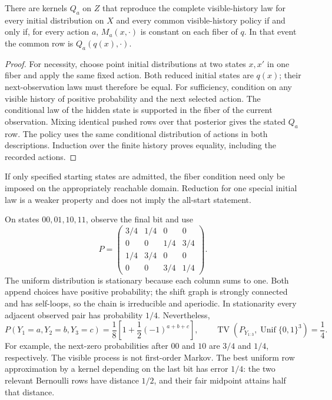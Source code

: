 \begin{theorem}\label{op:lumpability}
There are kernels \(Q_a\) on \(Z\) that reproduce the complete visible-history
law for every initial distribution on \(X\) and every common visible-history
policy if and only if, for every action \(a\), \(M_a(x,\cdot)\) is constant
on each fiber of \(q\).  In that event the common row is
\(Q_a(q(x),\cdot)\).
\end{theorem}
\begin{proof}
For necessity, choose point initial distributions at two states \(x,x'\) in
one fiber and apply the same fixed action.  Both reduced initial states are
\(q(x)\); their next-observation laws must therefore be equal.
For sufficiency, condition on any visible history of positive probability
and the next selected action.  The conditional law of the hidden state is
supported in the fiber of the current observation.  Mixing identical pushed
rows over that posterior gives the stated \(Q_a\) row.  The policy uses the
same conditional distribution of actions in both descriptions.  Induction
over the finite history proves equality, including the recorded actions.
\end{proof}

If only specified starting states are admitted, the fiber condition need
only be imposed on the appropriately reachable domain.  Reduction for one
special initial law is a weaker property and does not imply the all-start
statement.

\begin{example}\label{op:four-state}
On states \(00,01,10,11\), observe the final bit and use
\[
 P=\begin{pmatrix}
 3/4&1/4&0&0\\
 0&0&1/4&3/4\\
 1/4&3/4&0&0\\
 0&0&3/4&1/4
 \end{pmatrix}.
\]
The uniform distribution is stationary because each column sums to one.
Both append choices have positive probability; the shift graph is strongly
connected and has self-loops, so the chain is irreducible and aperiodic.
In stationarity every adjacent observed pair has probability \(1/4\).
Nevertheless,
\[
 P(Y_1=a,Y_2=b,Y_3=c)
 =\frac18\left[1+\frac12(-1)^{a+b+c}\right],
 \qquad
 \operatorname{TV}(P_{Y_{1:3}},\operatorname{Unif}\{0,1\}^3)=\frac14 .
\]
For example, the next-zero probabilities after \(00\) and \(10\) are \(3/4\)
and \(1/4\), respectively.  The visible process is not first-order Markov.
The best uniform row approximation by a kernel depending on the last bit
has error \(1/4\): the two relevant Bernoulli rows have distance \(1/2\),
and their fair midpoint attains half that distance.
\end{example}

